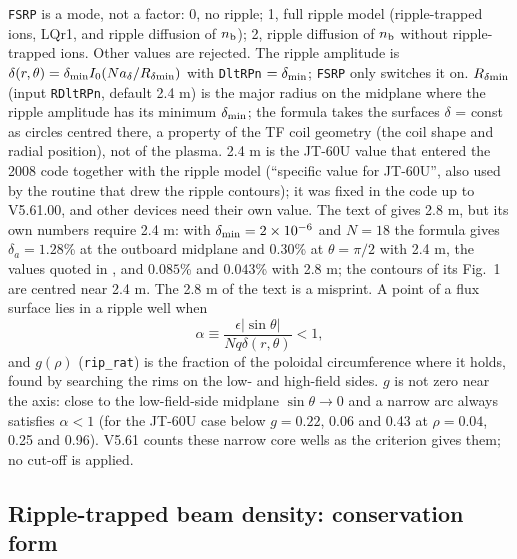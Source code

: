 \documentclass[11pt]{article}
\def\r#1{{\rm#1}}
\def\nb{n_\r{b}}
\begin{document}
\texttt{FSRP} is a mode, not a factor: 0, no ripple; 1, full ripple model
(ripple-trapped ions, LQr1, and ripple diffusion of $\nb$); 2, ripple diffusion
of $\nb$ without ripple-trapped ions.  Other values are rejected.  The ripple
amplitude is $\delta(r,\theta) = \delta_\r{min} I_0(N a_\delta/R_{\delta\r{min}})$
with \texttt{DltRPn} $=\delta_\r{min}$; \texttt{FSRP} only switches it on.
$R_{\delta\r{min}}$ (input \texttt{RDltRPn}, default 2.4 m) is the major radius on the
midplane where the ripple amplitude has its minimum $\delta_\r{min}$; the formula takes
the surfaces $\delta$ = const as circles centred there, a property of the TF coil
geometry (the coil shape and radial position), not of the plasma.  2.4 m is the JT-60U
value that entered the 2008 code together with the ripple model (``specific value for
JT-60U'', also used by the routine that drew the ripple contours); it was fixed in the
code up to V5.61.00, and other devices need their own value.  The text of \cite{NF2008}
gives 2.8 m, but
its own numbers require 2.4 m: with $\delta_\r{min} = 2\times10^{-6}$ and $N = 18$ the
formula gives $\delta_a = 1.28$\% at the outboard midplane and $0.30$\% at
$\theta = \pi/2$ with 2.4 m, the values quoted in \cite{NF2008}, and $0.085$\% and
$0.043$\% with 2.8 m; the contours of its Fig.~1 are centred near 2.4 m.  The 2.8 m of
the text is a misprint.  A point
of a flux surface lies in a ripple well when
\begin{equation}
  \alpha \equiv \frac{\epsilon|\sin\theta|}{Nq\delta(r,\theta)} < 1,
\end{equation}
and $g(\rho)$ (\texttt{rip\_rat}) is the fraction of the poloidal circumference where
it holds, found by searching the rims on the low- and high-field sides.
$g$ is not zero near the axis: close to the low-field-side midplane
$\sin\theta\to0$ and a narrow arc always satisfies $\alpha<1$ (for the JT-60U
case below $g = 0.22$, 0.06 and 0.43 at $\rho = 0.04$, 0.25 and 0.96).  V5.61
counts these narrow core wells as the criterion gives them; no cut-off is applied.

\subsection{Ripple-trapped beam density: conservation form}
\end{document}
